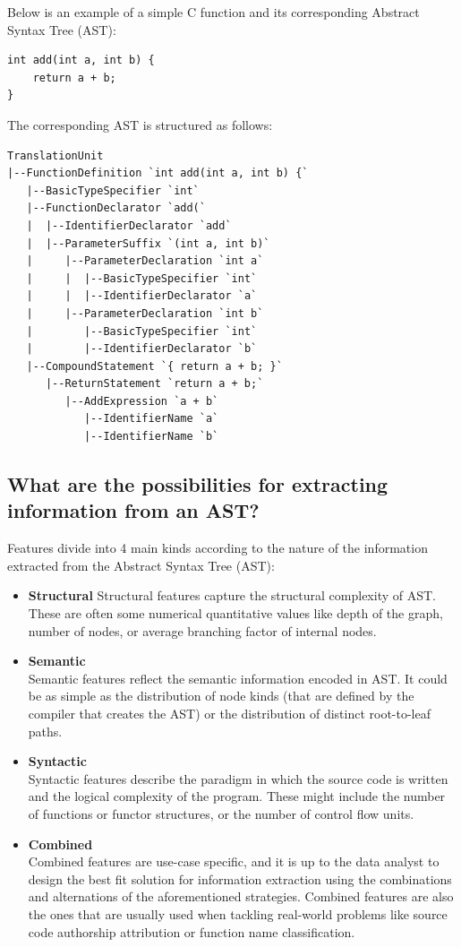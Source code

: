 \documentclass[10pt,english,a4paper]{report}
\begin{document}
Below is an example of a simple C function and its corresponding Abstract Syntax Tree (AST):
\begin{verbatim}
int add(int a, int b) {
    return a + b;
}
\end{verbatim}

The corresponding AST is structured as follows:
\begin{verbatim}
TranslationUnit
|--FunctionDefinition `int add(int a, int b) {`
   |--BasicTypeSpecifier `int`
   |--FunctionDeclarator `add(`
   |  |--IdentifierDeclarator `add`
   |  |--ParameterSuffix `(int a, int b)`
   |     |--ParameterDeclaration `int a`
   |     |  |--BasicTypeSpecifier `int`
   |     |  |--IdentifierDeclarator `a`
   |     |--ParameterDeclaration `int b`
   |        |--BasicTypeSpecifier `int`
   |        |--IdentifierDeclarator `b`
   |--CompoundStatement `{ return a + b; }`
      |--ReturnStatement `return a + b;`
         |--AddExpression `a + b`
            |--IdentifierName `a`
            |--IdentifierName `b`
\end{verbatim}
\label{verbatim:AST_example}

\subsection{What are the possibilities for extracting information from an AST?}
Features divide into 4 main kinds according to the nature of the information extracted from the Abstract Syntax Tree (AST):
\begin{itemize}
    \item \textbf{Structural} \label{item:structural}
    Structural features capture the structural complexity of AST. These are often some numerical quantitative values like depth of the graph, number of nodes, or average branching factor of internal nodes.
    \item \textbf{Semantic} \\
    Semantic features reflect the semantic information encoded in AST. It could be as simple as the distribution of node kinds (that are defined by the compiler that creates the AST) or the distribution of distinct root-to-leaf paths.
    \item \textbf{Syntactic} \\
    Syntactic features describe the paradigm in which the source code is written and the logical complexity of the program. These might include the number of functions or functor structures, or the number of control flow units.
    \item \textbf{Combined} \\
    Combined features are use-case specific, and it is up to the data analyst to design the best fit solution for information extraction using the combinations and alternations of the aforementioned strategies. Combined features are also the ones that are usually used when tackling real-world problems like source code authorship attribution or function name classification.  
\end{itemize}
\end{document}
